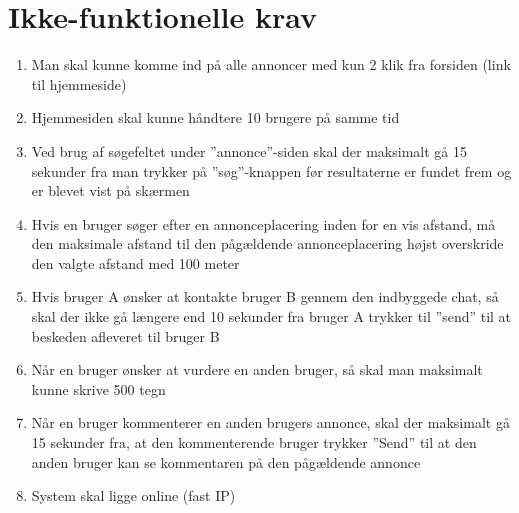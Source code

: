 \chapter{Ikke-funktionelle krav}

\begin{enumerate}
	\item Man skal kunne komme ind på alle annoncer med kun 2 klik fra forsiden (link til hjemmeside)
	
	\item Hjemmesiden skal kunne håndtere 10 brugere på samme tid
	
	\item Ved brug af søgefeltet under ''annonce''-siden skal der maksimalt gå 15 sekunder fra man trykker på ''søg''-knappen før resultaterne er fundet frem og er blevet vist på skærmen
	
	
	\item Hvis en bruger søger efter en annonceplacering inden for en vis afstand, må den maksimale afstand til den pågældende annonceplacering højst overskride den valgte afstand med 100 meter
	
	\item Hvis bruger A ønsker at kontakte bruger B gennem den indbyggede chat, så skal der ikke gå længere end 10 sekunder fra bruger A trykker til ''send'' til at beskeden afleveret til bruger B
	
	\item Når en bruger ønsker at vurdere en anden bruger, så skal man maksimalt kunne skrive 500 tegn
	
	\item Når en bruger kommenterer en anden brugers annonce, skal der maksimalt gå 15 sekunder fra, at den kommenterende bruger trykker ''Send'' til at den anden bruger kan se kommentaren på den pågældende annonce
	
	\item System skal ligge online (fast IP)
	
\end{enumerate}
